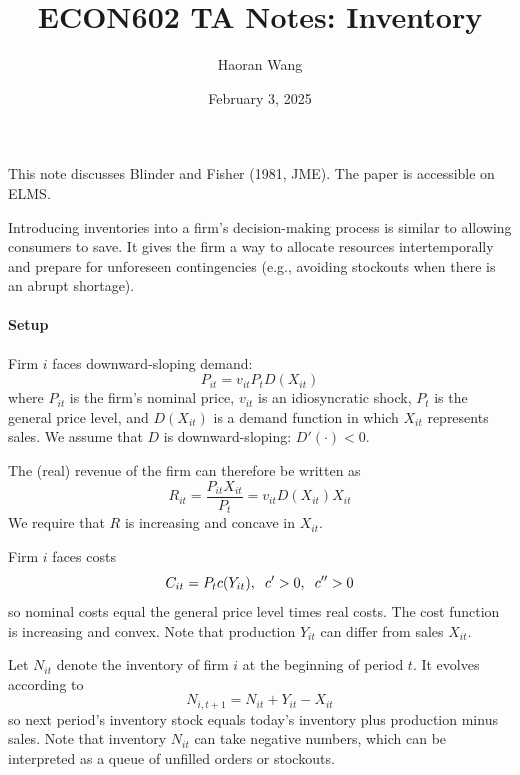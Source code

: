 \documentclass[12pt]{article}
\title{ECON602 TA Notes: Inventory}
\author{Haoran Wang}
\date{February 3, 2025}
\begin{document}
	\maketitle
	
	
	This note discusses Blinder and Fisher (1981, JME). The paper is accessible on ELMS.
	
		Introducing inventories into a firm's decision-making process is similar to allowing consumers to save. It gives the firm a way to allocate resources intertemporally and prepare for unforeseen contingencies (e.g., avoiding stockouts when there is an abrupt shortage). 
	
	\paragraph{Setup \\ [6pt]}
	
		Firm $i$ faces downward-sloping demand:
	\begin{equation}
		P_{it} = v_{it}P_{t}D(X_{it})
	\end{equation}
		where $P_{it}$ is the firm's nominal price, $v_{it}$ is an idiosyncratic shock, $P_{t}$ is the general price level, and $D(X_{it})$ is a demand function in which $X_{it}$ represents sales. We assume that $D$ is downward-sloping: $D'(\cdot) < 0$. 
	
	The (real) revenue of the firm can therefore be written as 
	\begin{equation}
		R_{it} = \frac{P_{it} X_{it}}{P_t} = v_{it} D(X_{it}) X_{it}
	\end{equation}
	We require that $R$ is increasing and concave in $X_{it}$.
	
		Firm $i$ faces costs
	\begin{equation}
		C_{it} = P_{t}c(Y_{it}), \hspace{2mm} c'>0, \hspace{2mm} c''>0
	\end{equation}
		so nominal costs equal the general price level times real costs. The cost function is increasing and convex. Note that production $Y_{it}$ can differ from sales $X_{it}$.
	
	Let $N_{it}$ denote the inventory of firm $i$ at the beginning of period $t$. It evolves according to
	\begin{equation}
		N_{i,t+1} = N_{it} + Y_{it} - X_{it}
	\end{equation} 
	so next period's inventory stock equals today's inventory plus production minus sales. Note that inventory $N_{it}$ can take negative numbers, which can be interpreted as a queue of unfilled orders or stockouts. 
	
\end{document}
